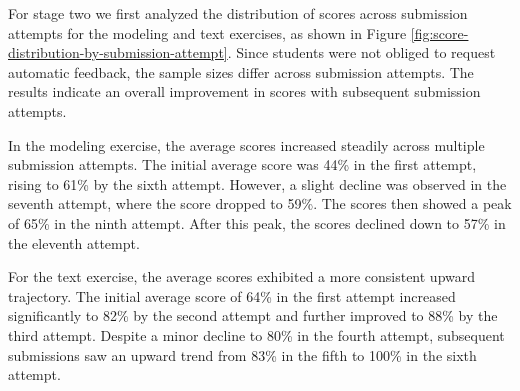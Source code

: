 \documentclass[sigconf,screen,review,anonymous]{acmart}
\begin{document}
For stage two we first analyzed the distribution of scores across submission attempts for the modeling and text exercises, as shown in Figure \ref{fig:score-distribution-by-submission-attempt}.
Since students were not obliged to request automatic feedback, the sample sizes differ across submission attempts.
The results indicate an overall improvement in scores with subsequent submission attempts.

In the modeling exercise, the average scores increased steadily across multiple submission attempts.
The initial average score was 44\% in the first attempt, rising to 61\% by the sixth attempt.
However, a slight decline was observed in the seventh attempt, where the score dropped to 59\%.
The scores then showed a peak of 65\% in the ninth attempt.
After this peak, the scores declined down to 57\% in the eleventh attempt.

For the text exercise, the average scores exhibited a more consistent upward trajectory.
The initial average score of 64\% in the first attempt increased significantly to 82\% by the second attempt and further improved to 88\% by the third attempt.
Despite a minor decline to 80\% in the fourth attempt, subsequent submissions saw an upward trend from 83\% in the fifth to 100\% in the sixth attempt.
\end{document}
